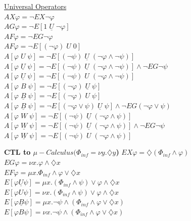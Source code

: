 \documentclass{article}
\begin{document}
\begin{multicols}{4}
\underline{Universal Operators} \\
$AX\varphi =  \neg EX \neg \varphi \qquad$ \\
$AG\varphi=  \neg E[1 \; \underline{U} \; \neg \varphi] $ \\
$AF\varphi =  \neg EG \neg \varphi $ \\
$AF\varphi =  \neg E[(\neg \varphi)\; U\; 0] $ \\
$A[\varphi \; U\; \psi]=  \neg E[(\neg \psi)\; \underline{U} \; (\neg \varphi \wedge \neg \psi)] $ \\
$A[\varphi \; \underline{U} \; \psi] =  \neg E[(\neg \psi) \; \underline{U}\; (\neg \varphi \wedge \neg \psi)]\wedge \neg EG \neg \psi$ \\
$A[\varphi \; \underline{U} \; \psi] =  \neg E[(\neg \psi) \; U\; (\neg \varphi \wedge \neg \psi)]$ \\
$A[\varphi \; B\; \psi]=  \neg E[(\neg \varphi)\; \underline{U} \; \psi] $ \\
$A[\varphi \; \underline{B}\; \psi]=  \neg E[(\neg \varphi)\; U \; \psi] $ \\
$A[\varphi \; \underline{B} \; \psi] =  \neg E[(\neg \varphi \vee \psi) \; \underline{U}\; \psi] \wedge \neg EG(\neg \varphi \vee \psi)$ \\
$A[\varphi \; W\; \psi]=  \neg E[(\neg \psi) \; \underline{U}\; (\neg \varphi \wedge \psi)]$ \\
$A[\varphi \; \underline{W} \; \psi] =  \neg E[(\neg \psi) \; \underline{U}\; (\neg \varphi \wedge \psi)] \wedge \neg EG\neg \psi $ \\
$A[\varphi \; \underline{W} \; \psi] =  \neg E[(\neg \psi) \; U\; (\neg \varphi \wedge \psi)]$

\textbf{CTL to $\mu -Calculus (\Phi _{inf} = \nu y.\diamondsuit y$)}
$EX\varphi = \diamondsuit (\Phi_{inf} \wedge \varphi)$ \\
$EG\varphi = \nu x.\varphi \wedge \diamondsuit x $ \\
$EF\varphi = \mu x.\Phi_{inf} \wedge \varphi \vee \diamondsuit x  $ \\
$E[ \varphi \underline{U} \psi] = \mu x.(\Phi_{inf} \wedge \psi) \vee \varphi \wedge \diamondsuit x $ \\
$E[ \varphi U \psi] = \nu x.(\Phi_{inf} \wedge \psi) \vee \varphi \wedge \diamondsuit x $ \\
$E[ \varphi \underline{B} \psi] = \mu x.\neg\psi \wedge (\Phi_{inf} \wedge \varphi \vee \diamondsuit x) $ \\
$E[ \varphi B \psi] = \nu x.\neg\psi \wedge (\Phi_{inf} \wedge \varphi \vee \diamondsuit x) $ \\

\lipsum
\lipsum

\end{multicols}
\end{document}
